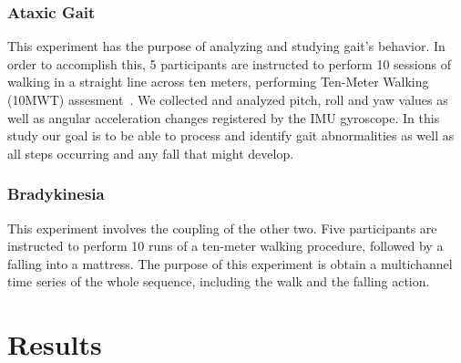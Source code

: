 \documentclass[conference]{IEEEtran}
\begin{document}
\subsubsection{Ataxic Gait}

This experiment has the purpose of analyzing and studying gait's behavior. In order to accomplish this,  5 participants are instructed to perform 10 sessions of walking in a straight line across ten meters, performing Ten-Meter Walking (10MWT) assesment~\cite{Olmos.etal2008}.  We collected and analyzed pitch, roll and yaw values as well as angular acceleration changes registered by the IMU gyroscope. In this study our goal is to be able to process and identify gait abnormalities as well as all steps occurring and any fall that might develop. 



\subsubsection{Bradykinesia}

This experiment involves the coupling of the other two.  Five participants are instructed to perform 10 runs of a ten-meter walking procedure, followed by a falling into a mattress.  The purpose of this experiment is obtain a multichannel time series of the whole sequence, including the walk and the falling action.




\section*{Results}
\end{document}
